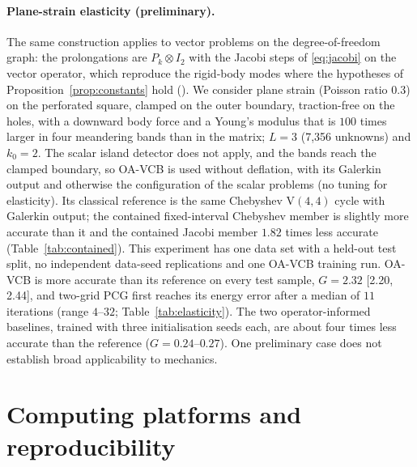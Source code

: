 \paragraph{Plane-strain elasticity (preliminary).}\label{sec:elasticity}

The same construction applies to vector problems on the degree-of-freedom graph: the prolongations are $P_k\otimes I_2$ with the
Jacobi steps of \eqref{eq:jacobi} on the vector operator, which reproduce the rigid-body modes where the hypotheses of
Proposition~\ref{prop:constants} hold (). We consider plane strain (Poisson ratio $0.3$) on the perforated square,
clamped on the outer boundary, traction-free on the holes, with a downward body force and a Young's modulus that is $100$ times
larger in four meandering bands than in the matrix; $L=3$ (7{,}356 unknowns) and $k_0=2$. The scalar island detector does not
apply, and the bands reach the clamped boundary, so OA-VCB is used without deflation, with its Galerkin output and otherwise the
configuration of the scalar problems (no tuning for elasticity). Its classical reference is the same Chebyshev V$(4,4)$ cycle with
Galerkin output; the contained fixed-interval Chebyshev member is slightly more accurate than it and the contained Jacobi member
$1.82$ times less accurate (Table~\ref{tab:contained}). This experiment has one data set with a held-out test split, no independent
data-seed replications and one OA-VCB training run. OA-VCB is more accurate than its reference on every test sample,
$G = 2.32$ [2.20, 2.44], and two-grid PCG first reaches its energy error after a median of $11$ iterations (range $4$--$32$;
Table~\ref{tab:elasticity}). The two operator-informed baselines, trained with three initialisation seeds each, are about four times
less accurate than the reference ($G = 0.24$--$0.27$). One preliminary case does not establish broad applicability to mechanics.

\section{Computing platforms and reproducibility}\label{app:platform}
